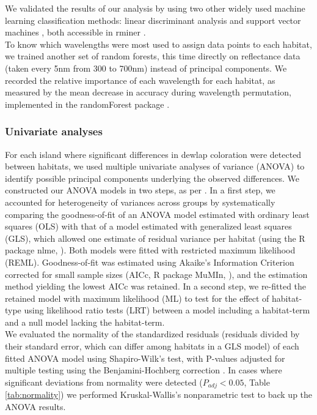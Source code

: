 We validated the results of our analysis by using two other widely used machine learning classification methods: linear discriminant analysis and support vector machines \citep{Cristianini2000, James2013}, both accessible in rminer \citep{Cortez2020}.\\

To know which wavelengths were most used to assign data points to each habitat, we trained another set of random forests, this time directly on reflectance data (taken every 5nm from 300 to 700nm) instead of principal components. We recorded the relative importance of each wavelength for each habitat, as measured by the mean decrease in accuracy during wavelength permutation, implemented in the randomForest package \citep{Liaw2002}.

\subsubsection*{Univariate analyses}

For each island where significant differences in dewlap coloration were detected between habitats, we used multiple univariate analyses of variance (ANOVA) to identify possible principal components underlying the observed differences. We constructed our ANOVA models in two steps, as per \citet{Zuur2009}. In a first step, we accounted for heterogeneity of variances across groups by systematically comparing the goodness-of-fit of an ANOVA model estimated with ordinary least squares (OLS) with that of a model estimated with generalized least squares (GLS), which allowed one estimate of residual variance per habitat (using the R package nlme, \citealt{Pinheiro2000, Pinheiro2020}). Both models were fitted with restricted maximum likelihood (REML). Goodness-of-fit was estimated using Akaike's Information Criterion corrected for small sample sizes (AICc, R package MuMIn, \citealt{Barton2019}), and the estimation method yielding the lowest AICc was retained. In a second step, we re-fitted the retained model with maximum likelihood (ML) to test for the effect of habitat-type using likelihood ratio tests (LRT) between a model including a habitat-term and a null model lacking the habitat-term.\\

We evaluated the normality of the standardized residuals (residuals divided by their standard error, which can differ among habitats in a GLS model) of each fitted ANOVA model using Shapiro-Wilk's test, with P-values adjusted for multiple testing using the Benjamini-Hochberg correction \citep{Benjamini1995}. In cases where significant deviations from normality were detected ($P_{adj} < 0.05$, Table \ref{tab:normality}) we performed Kruskal-Wallis's nonparametric test to back up the ANOVA results.\\

